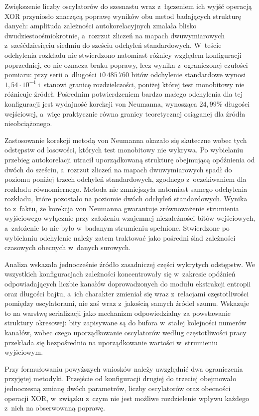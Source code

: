 Zwiększenie liczby oscylatorów do szesnastu wraz z~łączeniem ich wyjść operacją XOR
przyniosło znaczącą poprawę wyników obu metod badających strukturę danych: amplituda
zależności autokorelacyjnych zmalała blisko dwudziestoośmiokrotnie, a~rozrzut zliczeń na
mapach dwuwymiarowych z~sześćdziesięciu siedmiu do sześciu odchyleń standardowych. W~teście
odchylenia rozkładu nie stwierdzono natomiast różnicy względem konfiguracji poprzedniej,
co nie oznacza braku poprawy, lecz wynika z~ograniczonej czułości pomiaru: przy serii
o~długości $10\,485\,760$ bitów odchylenie standardowe wynosi $1{,}54 \cdot 10^{-4}$
i~stanowi granicę rozdzielczości, poniżej której test monobitowy nie różnicuje źródeł.
Pośrednim potwierdzeniem bardzo małego odchylenia dla tej konfiguracji jest wydajność
korekcji von Neumanna, wynosząca $24{,}99\%$ długości wejściowej, a~więc praktycznie równa
granicy teoretycznej osiąganej dla źródła nieobciążonego.

Zastosowanie korekcji metodą von Neumanna okazało się skuteczne wobec tych odstępstw od
losowości, których test monobitowy nie wykrywa. Po wybielaniu przebieg autokorelacji
utracił uporządkowaną strukturę obejmującą opóźnienia od dwóch do sześciu, a~rozrzut
zliczeń na mapach dwuwymiarowych spadł do poziomu poniżej trzech odchyleń standardowych,
zgodnego z~oczekiwaniem dla rozkładu równomiernego. Metoda nie zmniejszyła natomiast
samego odchylenia rozkładu, które pozostało na poziomie dwóch odchyleń standardowych.
Wynika to z~faktu, że korekcja von Neumanna gwarantuje zrównoważenie strumienia
wyjściowego wyłącznie przy założeniu wzajemnej niezależności bitów wejściowych, a~założenie
to nie było w~badanym strumieniu spełnione. Stwierdzone po wybielaniu odchylenie należy
zatem traktować jako pośredni ślad zależności czasowych obecnych w~danych surowych.

Analiza wskazała jednocześnie źródło zasadniczej części wykrytych odstępstw. We wszystkich
konfiguracjach zależności koncentrowały się w~zakresie opóźnień odpowiadających liczbie
kanałów doprowadzonych do modułu ekstrakcji entropii oraz długości bajtu, a~ich charakter
zmieniał się wraz z~relacjami częstotliwości pomiędzy oscylatorami, nie zaś wraz z~jakością
samych źródeł szumu. Wskazuje to na warstwę serializacji jako mechanizm odpowiedzialny za
powstawanie struktury okresowej: bity zapisywane są do bufora w~stałej kolejności numerów
kanałów, wobec czego uporządkowanie oscylatorów według częstotliwości pracy przekłada się
bezpośrednio na uporządkowanie wartości w~strumieniu wyjściowym.

Przy formułowaniu powyższych wniosków należy uwzględnić dwa ograniczenia przyjętej
metodyki. Przejście od konfiguracji drugiej do trzeciej obejmowało jednoczesną zmianę dwóch
parametrów, liczby oscylatorów oraz obecności operacji XOR, w~związku z~czym nie jest
możliwe rozdzielenie wpływu każdego z~nich na obserwowaną poprawę.
\FloatBarrier